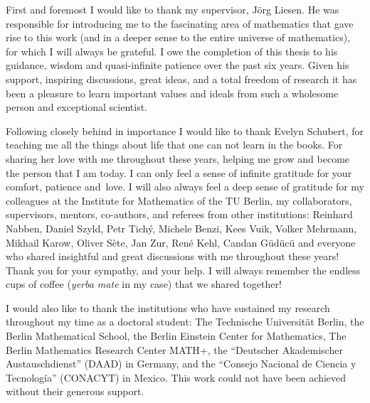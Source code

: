 \begin{changemargin}{-0.2cm}{-0.2cm}
\noindent
First and foremost I would like to thank my supervisor, J{\"o}rg Liesen.
He was responsible for introducing me to the fascinating area of mathematics that gave rise to this work (and in a deeper sense to the entire universe of mathematics), for which I will always be grateful. I owe the completion of this thesis to his guidance, wisdom and quasi-infinite patience over the past six years. Given his support, inspiring discussions, great ideas, and a total freedom of research it has been a pleasure to learn important values and ideals from such a wholesome person and exceptional scientist.

Following closely behind in importance I would like to thank Evelyn Schubert,
for teaching me all the things about life that one can not learn in the books. For sharing her love with me throughout these years, helping me grow and become the person that I am today. I can only feel a sense of infinite gratitude for your comfort, patience and~love.\linebreak
\indent I will also always feel a deep sense of gratitude for my colleagues at the Institute for Mathematics of the TU Berlin, my collaborators, supervisors, mentors, co-authors, and referees from other institutions: Reinhard Nabben, Daniel Szyld, Petr Tich{\'y}, Michele Benzi, Kees Vuik, Volker Mehrmann, Mikhail Karow, Oliver S{\`e}te, Jan Zur, Ren{\'e} Kehl, Candan G{\"u}d{\"u}c{\"u} and everyone who shared insightful and great discussions with me throughout these years! Thank you for your sympathy, and your help. I will always remember the endless cups of coffee (\emph{yerba mate} in my case) that we shared together!

I would also like to thank the institutions who have sustained my research throughout my time as a doctoral student: The Technische Universit\"at Berlin, the Berlin Mathematical School, the Berlin Einstein Center for Mathematics, The Berlin Mathematics Research Center MATH+, the ``Deutscher Akademischer Austauschdienst'' (DAAD) in Germany, and the ``Consejo Nacional de Ciencia y Tecnolog\'ia'' (CONACYT) in Mexico. This work could not have been achieved without their generous support.



\end{changemargin}
